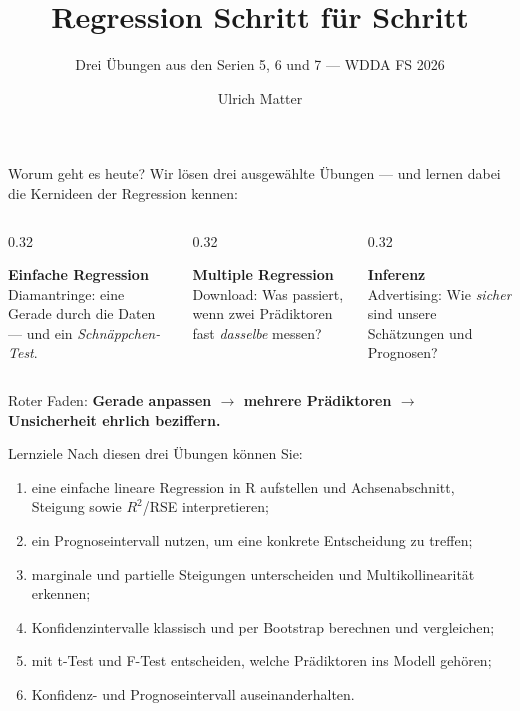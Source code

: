 \documentclass[aspectratio=169,11pt]{beamer}
\title{Regression Schritt für Schritt}
\subtitle{Drei Übungen aus den Serien 5, 6 und 7 --- WDDA FS 2026}
\author{Ulrich Matter}
\date{}
\institute{Berner Fachhochschule --- Datenmanagement und Datenanalyse}
\begin{document}
\frame{\titlepage}

\begin{frame}{Worum geht es heute?}
Wir lösen \alert{drei ausgewählte Übungen} --- und lernen dabei die
Kernideen der Regression kennen:

\vspace{0.4cm}
\begin{columns}[T]
\begin{column}{0.32\textwidth}
  \begin{konzept}[Serie 5]
  \textbf{Einfache Regression}\\[2pt]
  Diamantringe: eine Gerade durch die Daten --- und ein
  \emph{Schnäppchen-Test}.
  \end{konzept}
\end{column}
\begin{column}{0.32\textwidth}
  \begin{konzept}[Serie 6]
  \textbf{Multiple Regression}\\[2pt]
  Download: Was passiert, wenn zwei Prädiktoren fast
  \emph{dasselbe} messen?
  \end{konzept}
\end{column}
\begin{column}{0.32\textwidth}
  \begin{konzept}[Serie 7]
  \textbf{Inferenz}\\[2pt]
  Advertising: Wie \emph{sicher} sind unsere Schätzungen und
  Prognosen?
  \end{konzept}
\end{column}
\end{columns}

\vspace{0.4cm}
Roter Faden: \textbf{Gerade anpassen $\rightarrow$ mehrere Prädiktoren
$\rightarrow$ Unsicherheit ehrlich beziffern.}
\end{frame}

\begin{frame}{Lernziele}
Nach diesen drei Übungen können Sie:
\begin{enumerate}
  \item eine \alert{einfache lineare Regression} in R aufstellen und
        Achsenabschnitt, Steigung sowie $R^2$/RSE interpretieren;
  \item ein \alert{Prognoseintervall} nutzen, um eine konkrete
        Entscheidung zu treffen;
  \item \alert{marginale} und \alert{partielle} Steigungen unterscheiden
        und \alert{Multikollinearität} erkennen;
  \item \alert{Konfidenzintervalle} klassisch und per \alert{Bootstrap}
        berechnen und vergleichen;
  \item mit \alert{t-Test} und \alert{F-Test} entscheiden, welche
        Prädiktoren ins Modell gehören;
  \item \alert{Konfidenz-} und \alert{Prognoseintervall} auseinanderhalten.
\end{enumerate}
\end{frame}
\end{document}

